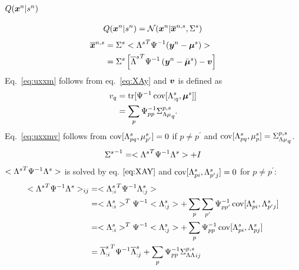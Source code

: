 \documentclass[a4paper]{article}
\begin{document}
\subsection{$Q(\boldsymbol{x}^n|s^n)$}
\begin{align}
  Q(\boldsymbol{x}^n|s^n)=\mathcal{N}(\boldsymbol{x}^n|\overline{\boldsymbol{x}}^{n,s},\Sigma^s)
\end{align}
\begin{align}
  \overline{\boldsymbol{x}}^{n,s}
  &=\Sigma^s<{\Lambda^s}^T\Psi^{-1}(\boldsymbol{y}^n-\boldsymbol{\mu}^s)> \\
  &=\Sigma^s\left[{\overline{\Lambda}^s}^T\Psi^{-1}\left(\boldsymbol{y}^n-\bar{\boldsymbol{\mu}}^s\right)-\boldsymbol{v}\right] \label{eq:uxxm}
\end{align}
Eq.~\ref{eq:uxxm} follows from eq.~\ref{eq:XAy} and $\boldsymbol{v}$ is defined as
\begin{align}
  v_q
  &=\operatorname{tr}[\Psi^{-1}\operatorname{cov}[\Lambda^s_{:q},\boldsymbol{\mu}^s]] \\
  &=\sum_p \Psi^{-1}_{pp} {\Sigma^{p,s}_{\Lambda\mu}}_q. \label{eq:uxxmv}
\end{align}
Eq.~\ref{eq:uxxmv} follows from $\operatorname{cov}[\Lambda^s_{pq},\mu^s_{p^\prime}]=0$ if $p\neq p^\prime$ and $\operatorname{cov}[\Lambda^s_{pq},\mu^s_{p}]={\Sigma^{p,s}_{\Lambda\mu}}_q$.
\begin{align}
  {\Sigma^s}^{-1}=<{\Lambda^s}^T \Psi^{-1} \Lambda^s>+I
\end{align}
$<{\Lambda^s}^T \Psi^{-1} \Lambda^s>$ is solved by eq. $\ref{eq:XAY}$ and $\operatorname{cov}[\Lambda^s_{pi},\Lambda^s_{p^\prime j}]=0$ for $p\ne p^\prime$:
\begin{align}
  <{\Lambda^s}^T \Psi^{-1} \Lambda^s>_{ij}&=<{\Lambda^s_{:i}}^T \Psi^{-1} \Lambda^s_{:j}> \\
  &=<\Lambda^s_{:i}>^T\Psi^{-1} <\Lambda^s_{:j}>+\sum_p\sum_{p^\prime} \Psi^{-1}_{pp^\prime}\operatorname{cov}[\Lambda^s_{pi},\Lambda^s_{p^\prime j}] \\
  &=<\Lambda^s_{:i}>^T\Psi^{-1} <\Lambda^s_{:j}>+\sum_p \Psi^{-1}_{pp}\operatorname{cov}[\Lambda^s_{pi},\Lambda^s_{pj}] \\
  &={\overline{\Lambda}^s_{:i}}^T\Psi^{-1} \overline{\Lambda}^s_{:j}+\sum_p \Psi^{-1}_{pp}{\Sigma^{p,s}_{\Lambda\Lambda}}_{ij}
\end{align}
\end{document}

